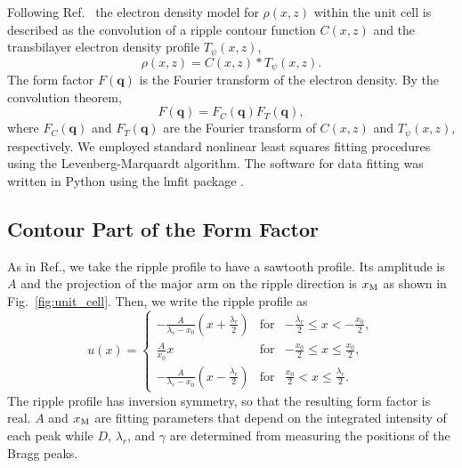 Following Ref.~\cite{ref:Sun96} the electron density model for $\rho(x,z)$ within 
the unit cell is described
as the convolution of a ripple contour function $C(x,z)$ and the transbilayer
electron density profile $T_\psi(x,z)$,
\begin{equation}
  \rho(x,z) = C(x,z) * T_\psi(x,z).
\end{equation}
The form factor $F(\mathbf{q})$ is the Fourier transform of the electron density.
By the convolution theorem, 
\begin{equation}
  F(\mathbf{q}) = F_C(\mathbf{q})F_T(\mathbf{q}),
\end{equation}
where $F_C(\mathbf{q})$ and $F_T(\mathbf{q})$ are the Fourier transform 
of $C(x,z)$ and $T_\psi(x,z)$, respectively.
We employed standard nonlinear least squares fitting procedures using
the Levenberg-Marquardt algorithm.
The software for data fitting was written in Python using 
the lmfit package \cite{ref:lmfit}.

\subsection{Contour Part of the Form Factor}\label{sec:contour}
As in Ref.\cite{ref:Sun96}, we take the ripple profile to have a sawtooth profile. Its
amplitude is $A$ and the projection of the major arm on the 
ripple direction is $x_\textrm{M}$ as shown in Fig.~\ref{fig:unit_cell}. 
Then, we write the ripple profile as
\begin{equation}
  u(x) = \left\{
    \begin{array}{ccc}
    -\frac{A}{\lambda_r-x_0}\left(x+\frac{\lambda_r}{2}\right) 
      & \text{for} 
      & -\frac{\lambda_r}{2} \leq x < -\frac{x_0}{2}, \\
    \frac{A}{x_0}x 
      & \text{for} 
      & -\frac{x_0}{2} \leq x \leq \frac{x_0}{2}, \\
    -\frac{A}{\lambda_r-x_0} \left(x-\frac{\lambda_r}{2}\right)
      & \text{for} 
      & \frac{x_0}{2} < x \leq \frac{\lambda_r}{2}.
    \end{array} \right.
  \label{eq:sawtooth}
\end{equation}
The ripple profile has inversion symmetry, so that the resulting
form factor is real. $A$ and $x_\textrm{M}$ are fitting parameters that depend 
on the integrated intensity of each peak while $D$, $\lambda_r$, and $\gamma$
are determined from measuring the positions of the Bragg peaks.

